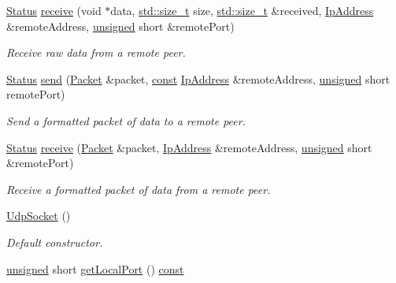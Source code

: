 \begin{DoxyCompactItemize}
\hyperlink{classsf_1_1_socket_a51bf0fd51057b98a10fbb866246176dc}{Status} \hyperlink{classsf_1_1_udp_socket_ade9ca0f7ed7919136917b0b997a9833a}{receive} (void $\ast$data, \hyperlink{nc__alloc_8h_a7b60c5629e55e8ec87a4547dd4abced4}{std\-::size\-\_\-t} size, \hyperlink{nc__alloc_8h_a7b60c5629e55e8ec87a4547dd4abced4}{std\-::size\-\_\-t} \&received, \hyperlink{classsf_1_1_ip_address}{Ip\-Address} \&remote\-Address, \hyperlink{curses_8priv_8h_aca40206900cfc164654362fa8d4ad1e6}{unsigned} short \&remote\-Port)
\begin{DoxyCompactList}\small\item\em Receive raw data from a remote peer. \end{DoxyCompactList}\item 
\hyperlink{classsf_1_1_socket_a51bf0fd51057b98a10fbb866246176dc}{Status} \hyperlink{classsf_1_1_udp_socket_a48969a62c80d40fd74293a740798e435}{send} (\hyperlink{classsf_1_1_packet}{Packet} \&packet, \hyperlink{term__entry_8h_a57bd63ce7f9a353488880e3de6692d5a}{const} \hyperlink{classsf_1_1_ip_address}{Ip\-Address} \&remote\-Address, \hyperlink{curses_8priv_8h_aca40206900cfc164654362fa8d4ad1e6}{unsigned} short remote\-Port)
\begin{DoxyCompactList}\small\item\em Send a formatted packet of data to a remote peer. \end{DoxyCompactList}\item 
\hyperlink{classsf_1_1_socket_a51bf0fd51057b98a10fbb866246176dc}{Status} \hyperlink{classsf_1_1_udp_socket_afdd5c655d00c96222d5b477fc057a22b}{receive} (\hyperlink{classsf_1_1_packet}{Packet} \&packet, \hyperlink{classsf_1_1_ip_address}{Ip\-Address} \&remote\-Address, \hyperlink{curses_8priv_8h_aca40206900cfc164654362fa8d4ad1e6}{unsigned} short \&remote\-Port)
\begin{DoxyCompactList}\small\item\em Receive a formatted packet of data from a remote peer. \end{DoxyCompactList}\item 
\hyperlink{classsf_1_1_udp_socket_abb10725e26dee9d3a8165fe87ffb71bb}{Udp\-Socket} ()
\begin{DoxyCompactList}\small\item\em Default constructor. \end{DoxyCompactList}\item 
\hyperlink{curses_8priv_8h_aca40206900cfc164654362fa8d4ad1e6}{unsigned} short \hyperlink{classsf_1_1_udp_socket_a8ce625debd4b1f885366a69faa270086}{get\-Local\-Port} () \hyperlink{term__entry_8h_a57bd63ce7f9a353488880e3de6692d5a}{const} 

\end{DoxyCompactItemize}
